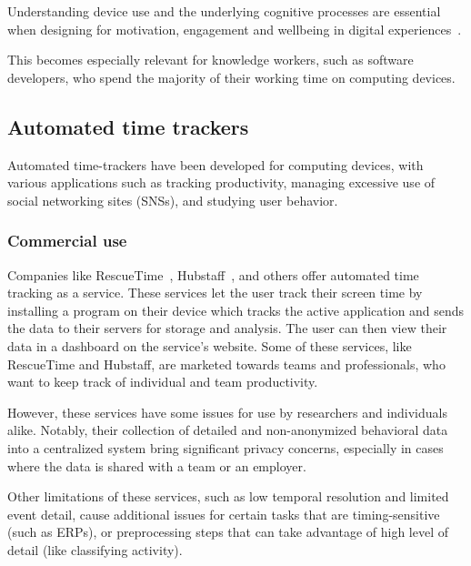 \documentclass[a4paper]{article}
\begin{document}
\begin{refsection}
    Understanding device use and the underlying cognitive processes are essential when designing for motivation, engagement and wellbeing in digital experiences~\cite{peters_designing_2018}.

    This becomes especially relevant for knowledge workers, such as software developers, who spend the majority of their working time on computing devices.



\subsection{Automated time trackers}

    Automated time-trackers have been developed for computing devices, with various applications such as tracking productivity, managing excessive use of social networking sites (SNSs), and studying user behavior.

    \subsubsection{Commercial use}

        Companies like RescueTime~\cite{noauthor_rescuetime_nodate}, Hubstaff~\cite{noauthor_hubstaff_nodate}, and others offer automated time tracking as a service. These services let the user track their screen time by installing a program on their device which tracks the active application and sends the data to their servers for storage and analysis. The user can then view their data in a dashboard on the service's website. Some of these services, like RescueTime and Hubstaff, are marketed towards teams and professionals, who want to keep track of individual and team productivity.

        However, these services have some issues for use by researchers and individuals alike. Notably, their collection of detailed and non-anonymized behavioral data into a centralized system bring significant privacy concerns, especially in cases where the data is shared with a team or an employer.

        Other limitations of these services, such as low temporal resolution and limited event detail, cause additional issues for certain tasks that are timing-sensitive (such as ERPs), or preprocessing steps that can take advantage of high level of detail (like classifying activity).


\end{refsection}
\end{document}
